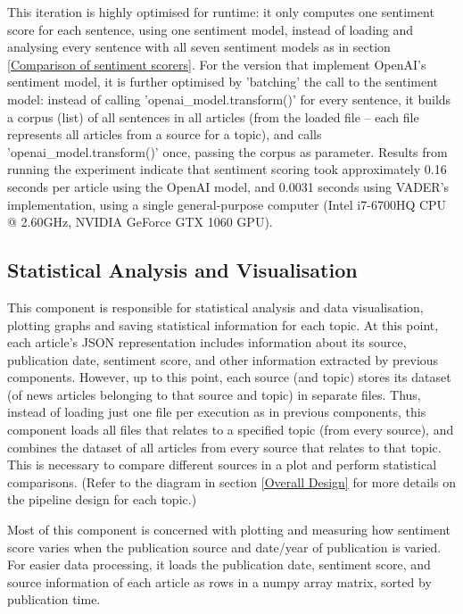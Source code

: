 \documentclass{report}
\begin{document}
This iteration is highly optimised for runtime: it only computes one sentiment score for each sentence, using one sentiment model, instead of loading and analysing every sentence with all seven sentiment models as in section \ref{Comparison of sentiment scorers}.
For the version that implement OpenAI's sentiment model, it is further optimised by 'batching' the call to the sentiment model: instead of calling 'openai\_model.transform()' for every sentence, it builds a corpus (list) of all sentences in all articles (from the loaded file -- each file represents all articles from a source for a topic), and calls 'openai\_model.transform()' once, passing the corpus as parameter.
Results from running the experiment indicate that sentiment scoring took approximately 0.16 seconds per article using the OpenAI model, and 0.0031 seconds using VADER's implementation, using a single general-purpose computer (Intel i7-6700HQ CPU @ 2.60GHz, NVIDIA GeForce GTX 1060 GPU).

\subsection{Statistical Analysis and Visualisation} \label{des-visualisation}

This component is responsible for statistical analysis and data visualisation, plotting graphs and saving statistical information for each topic.
At this point, each article's JSON representation includes information about its source, publication date, sentiment score, and other information extracted by previous components.
However, up to this point, each source (and topic) stores its dataset (of news articles belonging to that source and topic) in separate files.
Thus, instead of loading just one file per execution as in previous components, this component loads all files that relates to a specified topic (from every source), and combines the dataset of all articles from every source that relates to that topic.
This is necessary to compare different sources in a plot and perform statistical comparisons.
(Refer to the diagram in section \ref{Overall Design} for more details on the pipeline design for each topic.)

Most of this component is concerned with plotting and measuring how sentiment score varies when the publication source and date/year of publication is varied.
For easier data processing, it loads the publication date, sentiment score, and source information of each article as rows in a numpy array matrix, sorted by publication time.
\end{document}
